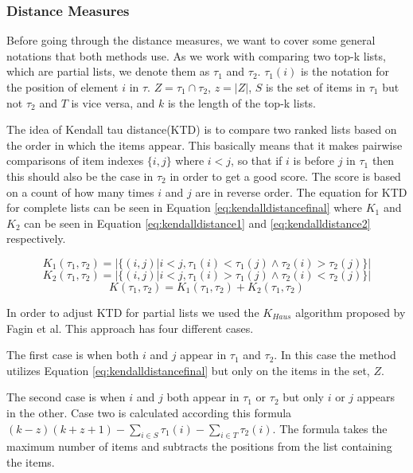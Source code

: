 \subsubsection{Distance Measures}\label{sec:distance}
Before going through the distance measures, we want to cover some general notations that both methods use. As we work with comparing two top-k lists, which are partial lists, we denote them as $\tau_1$ and $\tau_2$. $\tau_1 (i)$ is the notation for the position of element $i$ in $\tau$. $Z = \tau_1 \cap \tau_2$, $z=|Z|$, $S$ is the set of items in $\tau_1$ but not $\tau_2$ and $T$ is vice versa, and $k$ is the length of the top-k lists.

The idea of Kendall tau distance(KTD) is to compare two ranked lists based on the order in which the items appear. This basically means that it makes pairwise comparisons of item indexes $\{i,j\}$ where $i < j$, so that if $i$ is before $j$ in $\tau_1$ then this should also be the case in $\tau_2$ in order to get a good score. The score is based on a count of how many times $i$ and $j$ are in reverse order. The equation for KTD for complete lists can be seen in Equation \ref{eq:kendalldistancefinal} where $K_1$ and $K_2$ can be seen in Equation \ref{eq:kendalldistance1} and \ref{eq:kendalldistance2} respectively.

\begin{equation}\label{eq:kendalldistance1}
K_1(\tau_1,\tau_2) = | \{(i,j) | i < j, \tau_1 (i) < \tau_1 (j) \land \tau_2 (i) > \tau_2 (j)\}|
\end{equation}
\begin{equation}\label{eq:kendalldistance2}
K_2(\tau_1,\tau_2) = | \{(i,j) | i < j, \tau_1 (i) > \tau_1 (j) \land \tau_2 (i) < \tau_2 (j) \} |
\end{equation}
\begin{equation}\label{eq:kendalldistancefinal}
K(\tau_1,\tau_2) = K_1(\tau_1,\tau_2) + K_2(\tau_1,\tau_2)
\end{equation}

In order to adjust KTD for partial lists we used the $K_{Haus}$ algorithm proposed by Fagin et al\cite{comparing:topk}. This approach has four different cases.

The first case is when both $i$ and $j$ appear in $\tau_1$ and $\tau_2$. In this case the method utilizes Equation \ref{eq:kendalldistancefinal} but only on the items in the set, $Z$.

The second case is when $i$ and $j$ both appear in $\tau_1$ or $\tau_2$ but only $i$ or $j$ appears in the other. Case two is calculated according this formula $(k-z)(k+z+1)- \sum_{i \in S} \tau_1(i)- \sum_{i \in T} \tau_2(i)$. The formula takes the maximum number of items and subtracts the positions from the list containing the items.

